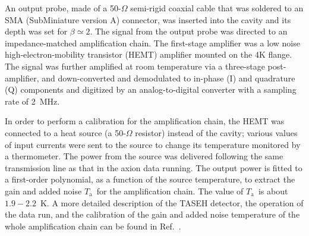 \documentclass[%
 reprint,prl, %
 amsmath,amssymb,
 aps,
]{revtex4-2}
\newcommand{\ta}{\ensuremath{T_\text{a}}}
\newcommand{\noise}{\ensuremath{1.9 - 2.2}}
\begin{document}
An output probe, made of a 50-$\Omega$ semi-rigid coaxial cable that was 
soldered to an SMA (SubMiniature version A) connector, was inserted into the 
cavity and its depth was set for 
$\beta\simeq2$.  The signal from the output probe was directed to an 
impedance-matched amplification chain. The first-stage amplifier was 
a low noise high-electron-mobility transistor (HEMT) amplifier 
mounted on the 4K flange. 
The signal was further amplified at room temperature via a 
three-stage post-amplifier, and down-converted 
and demodulated to in-phase (I) and quadrature (Q) components and digitized 
by an analog-to-digital converter with a sampling rate of 2~MHz. 


In order to perform a calibration for the amplification chain, 
the HEMT was connected to a heat source (a 50-$\Omega$ resistor) instead of
the cavity;
various values of input currents were sent to the source to change its
temperature monitored by a thermometer. The power from the source
was delivered following the same transmission line as that in the axion
data running. 
The output power is fitted to a first-order polynomial, as a function of
the source temperature, to extract the gain and added noise \ta\ for the
amplification chain. The value of \ta\ is about \noise~K. 
%
A more detailed description of the TASEH detector, the operation of the 
data run, and the calibration of the gain and added noise temperature of the 
whole amplification chain can be found in Ref.~\cite{TASEHInstrumentation}. 




\end{document}
